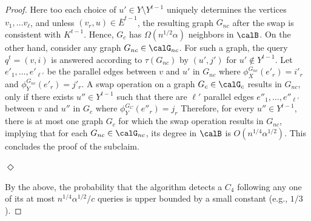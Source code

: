 \begin{proof}
  Here too each choice of $u'\in Y\setminus Y^{t-1}$ uniquely determines the vertices $v_1, \ldots v_{\ell}$, and unless $(v_{r},u)\in \overline{E}^{t-1}$, the resulting graph $G_{nc}$ after the swap is consistent with $K^{t-1}$. Hence,  $G_c$ has $\Omega(n^{1/2}\alpha)$ neighbors in $\calB$.
    On the other hand,  consider any graph $G_{nc} \in \calG_{nc}$. 
    For such a graph, the query $q^t = (v,i)$ is answered according to $\tau(G_{nc})$ by $(u',j')$ for $u' \notin Y^{t-1}$.
    Let $e'_1,\dots,e'_{\ell'}$ be the parallel edges between $v$
    and $u'$ in $G_{nc}$ where $\phi^{G_{nc}}_X(e'_r)=i'_r$ and
    $\phi^{G_{nc}}_Y(e'_r)=j'_r$.
    A swap operation on a graph $G_{c} \in \calG_c$ results in $G_{nc}$, only if there exists $u''\in Y^{t-1}$ such that  
    there are $\ell'$ parallel edges $e''_1,\dots,e''_{\ell'}$ between $v$ and $u''$ in $G_c$ where $\phi^{G_C}_Y(e''_r)=j_r$
    Therefore, for every  $u''\in Y^{t-1}$, there  is at most  one graph $G_c$ for which the swap operation results in $G_{nc}$, implying that for each $G_{nc}\in \calG_{nc}$, its degree in $\calB$ is $O(n^{1/4}\alpha^{1/2})$. This concludes the proof of the subclaim.
\fi
  {\hspace*{\fill}$\Diamond$\par} 

\smallskip
By the above, the probability that the algorithm detects a $C_4$ following any one of its at most
$n^{1/4}\alpha^{1/2}/c$ queries is upper bounded by a small constant (e.g., $1/3$).
\end{proof}


